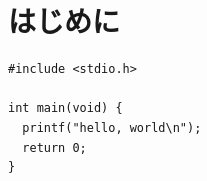 \documentclass[../main.tex]{subfiles}
\begin{document}
\chapter{はじめに}

\begin{verbatim}
#include <stdio.h>

int main(void) {
  printf("hello, world\n");
  return 0;
}
\end{verbatim}
\end{document}
